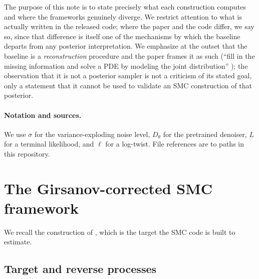 \documentclass[11pt]{article}
\begin{document}
The purpose of this note is to state precisely what each construction computes and where the
frameworks genuinely diverge. We restrict attention to what is actually written in the released
code; where the paper and the code differ, we say so, since that difference is itself one of the
mechanisms by which the baseline departs from any posterior interpretation. We emphasize at the
outset that the baseline is a \emph{reconstruction} procedure and the paper frames it as such
(``fill in the missing information and solve a PDE by modeling the joint distribution''
\citealp{huang2024diffusionpde}); the observation that it is not a posterior sampler is not a
criticism of its stated goal, only a statement that it cannot be used to validate an SMC
construction of that posterior.

\paragraph{Notation and sources.} We use $\sigma$ for the variance-exploding noise level, $D_\theta$
for the pretrained denoiser, $L$ for a terminal likelihood, and $\ell$ for a log-twist. File
references are to paths in this repository.

\section{The Girsanov-corrected SMC framework}\label{sec:framework}

We recall the construction of \citet{note1}, which is the target the SMC code is built to estimate.

\subsection{Target and reverse processes}
\end{document}

